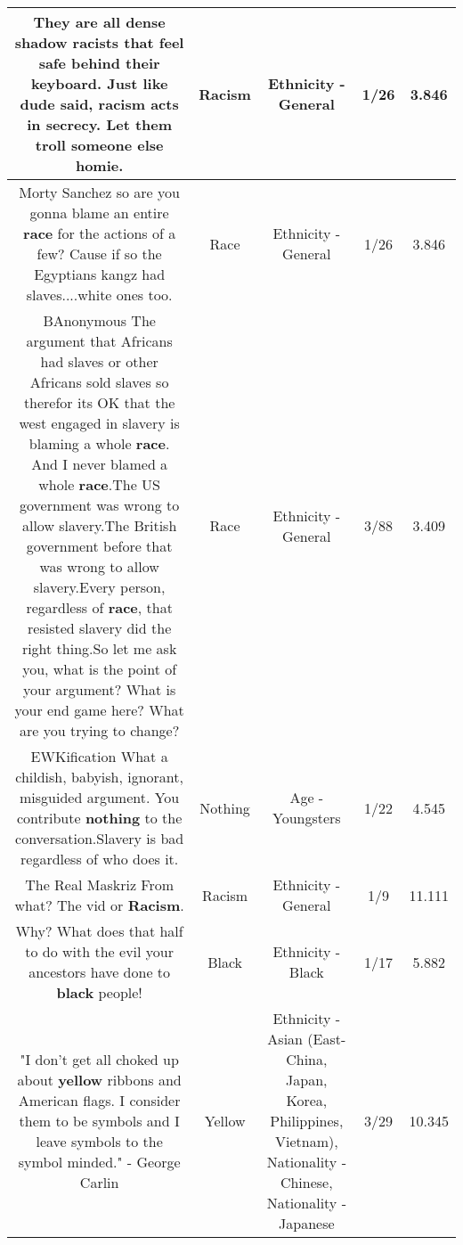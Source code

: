 \documentclass[11pt]{article}
\newlength\mylength
\begin{document}
\begin{center}
\begin{longtable}{|C{.65\mylength}|C{.30\mylength}|C{.12\mylength}|C{.12\mylength}|C{.12\mylength}|}
  \small They are all dense shadow racists that feel safe behind their keyboard. Just like dude said, \textbf{racism} acts in secrecy. Let them troll someone else homie.\normalsize   & Racism & Ethnicity - General & 1/26 & 3.846 \\  \hline
  \small Morty Sanchez so are you gonna blame an entire \textbf{race} for the actions of a few? Cause if so the Egyptians kangz had slaves....white ones too.\normalsize   & Race & Ethnicity - General & 1/26 & 3.846 \\  \hline
  \small BAnonymous The argument that Africans had slaves or other Africans sold slaves so therefor its OK that the west engaged in slavery is blaming a whole \textbf{race}. And I never blamed a whole \textbf{race}.The US government was wrong to allow slavery.The British government before that was wrong to allow slavery.Every person, regardless of \textbf{race}, that resisted slavery did the right thing.So let me ask you, what is the point of your argument? What is your end game here? What are you trying to change?\normalsize   & Race & Ethnicity - General & 3/88 & 3.409 \\  \hline
  \small EWKification What a childish, babyish, ignorant, misguided argument. You contribute \textbf{nothing} to the conversation.Slavery is bad regardless of who does it.\normalsize   & Nothing & Age - Youngsters & 1/22 & 4.545 \\  \hline
  \small The Real Maskriz From what? The vid or \textbf{Racism}.\normalsize   & Racism & Ethnicity - General & 1/9 & 11.111 \\  \hline
  \small Why? What does that half to do with the evil your ancestors have done to \textbf{black} people!\normalsize   & Black & Ethnicity - Black & 1/17 & 5.882 \\  \hline
  \small "I don't get all choked up about \textbf{y\textbf{e\textbf{llow}}} ribbons and American flags. I consider them to be symbols and I leave symbols to the symbol minded." - George Carlin\normalsize   & Yellow & Ethnicity - Asian (East- China, Japan, Korea, Philippines, Vietnam), Nationality - Chinese, Nationality - Japanese & 3/29 & 10.345 \\  \hline

\end{longtable}
\end{center}
\end{document}
